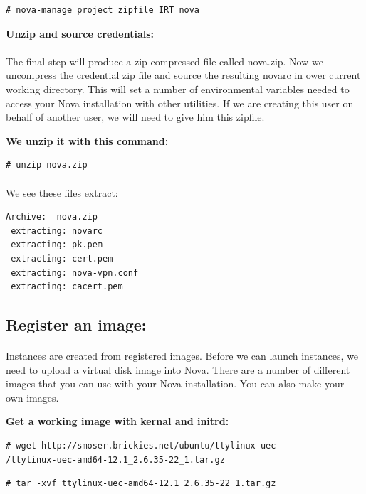 \begin{lstlisting}[language={[Latex]TeX}, frame=single]
# nova-manage project zipfile IRT nova
\end{lstlisting}

\textbf{Unzip and source credentials:}

\paragraph{} The final step will produce a zip-compressed file called nova.zip. Now we uncompress the credential zip file and source the resulting novarc  in ower current working directory. 
This will set a number of environmental variables needed to access your Nova installation with other utilities. 
If we are creating this user on behalf of another user, we will need to give him this zipfile.\par
\textbf{ We unzip it with this command:}
\begin{lstlisting}[language={[Latex]TeX}, frame=single]
# unzip nova.zip
\end{lstlisting}
\paragraph{}We see these files extract:\par 
\begin{lstlisting}[language={[Latex]TeX}, frame=single]
Archive:  nova.zip
 extracting: novarc
 extracting: pk.pem
 extracting: cert.pem
 extracting: nova-vpn.conf
 extracting: cacert.pem
\end{lstlisting}

\newpage
\subsection{Register an image:}
\paragraph{}Instances are created from registered images. Before we can launch instances, we need to upload a virtual disk image into Nova. 
There are a number of different images that you can use with your Nova installation. 
You can also make your own images.\par
\textbf{Get a working image with kernal and initrd:}
\begin{lstlisting}[language={[Latex]TeX}, frame=single]
# wget http://smoser.brickies.net/ubuntu/ttylinux-uec
/ttylinux-uec-amd64-12.1_2.6.35-22_1.tar.gz
\end{lstlisting}
\begin{lstlisting}[language={[Latex]TeX}, frame=single]
# tar -xvf ttylinux-uec-amd64-12.1_2.6.35-22_1.tar.gz
\end{lstlisting}



